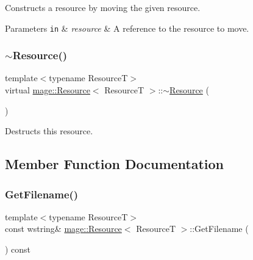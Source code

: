 Constructs a resource by moving the given resource.


\begin{DoxyParams}[1]{Parameters}
\mbox{\tt in}  & {\em resource} & A reference to the resource to move. \\
\hline
\end{DoxyParams}
\mbox{\label{classmage_1_1_resource_a56a3ac799224e100b271b65ec455b59e}} 
\subsubsection{\texorpdfstring{$\sim$\+Resource()}{~Resource()}}
{\footnotesize\ttfamily template$<$typename ResourceT$>$ \\
virtual \mbox{\hyperlink{classmage_1_1_resource}{mage\+::\+Resource}}$<$ ResourceT $>$\+::$\sim$\mbox{\hyperlink{classmage_1_1_resource}{Resource}} (\begin{DoxyParamCaption}{ }\end{DoxyParamCaption})\hspace{0.3cm}{\ttfamily [virtual]}}

Destructs this resource. 

\subsection{Member Function Documentation}
\mbox{\label{classmage_1_1_resource_a21bed60ba52a741eaffddc953f241be7}} 
\subsubsection{\texorpdfstring{Get\+Filename()}{GetFilename()}}
{\footnotesize\ttfamily template$<$typename ResourceT$>$ \\
const wstring\& \mbox{\hyperlink{classmage_1_1_resource}{mage\+::\+Resource}}$<$ ResourceT $>$\+::Get\+Filename (\begin{DoxyParamCaption}{ }\end{DoxyParamCaption}) const\hspace{0.3cm}{\ttfamily [noexcept]}}


